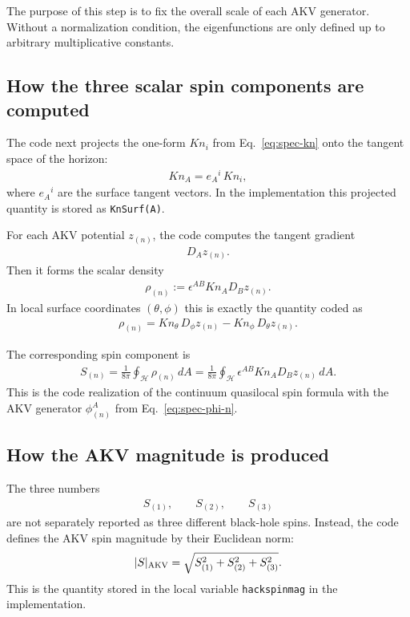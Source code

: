 The purpose of this step is to fix the overall scale of each AKV generator.  Without a normalization condition, the eigenfunctions are only defined up to arbitrary multiplicative constants.

\subsection{How the three scalar spin components are computed}

The code next projects the one-form $Kn_i$ from Eq.~\eqref{eq:spec-kn} onto the tangent space of the horizon:
\begin{align}
Kn_A = e_A{}^i\, Kn_i,
\end{align}
where $e_A{}^i$ are the surface tangent vectors.  In the implementation this projected quantity is stored as \texttt{KnSurf(A)}.

For each AKV potential $z_{(n)}$, the code computes the tangent gradient
\begin{align}
D_A z_{(n)}.
\end{align}
Then it forms the scalar density
\begin{align}
\rho_{(n)}
  := \epsilon^{AB} Kn_A D_B z_{(n)}.
\label{eq:spec-rho-n}
\end{align}
In local surface coordinates $(\theta,\phi)$ this is exactly the quantity coded as
\begin{align}
\rho_{(n)} = Kn_\theta\, D_\phi z_{(n)} - Kn_\phi\, D_\theta z_{(n)}.
\end{align}

The corresponding spin component is
\begin{align}
S_{(n)} = \frac{1}{8\pi}\oint_{\mathcal H} \rho_{(n)}\, dA
        = \frac{1}{8\pi}\oint_{\mathcal H} \epsilon^{AB} Kn_A D_B z_{(n)}\, dA.
\label{eq:spec-Sn}
\end{align}
This is the code realization of the continuum quasilocal spin formula with the AKV generator $\phi^A_{(n)}$ from Eq.~\eqref{eq:spec-phi-n}.

\subsection{How the AKV magnitude is produced}

The three numbers
\begin{align}
S_{(1)}, \qquad S_{(2)}, \qquad S_{(3)}
\end{align}
are not separately reported as three different black-hole spins.  Instead, the code defines the AKV spin magnitude by their Euclidean norm:
\begin{align}
|S|_{\rm AKV}
  = \sqrt{S_{(1)}^2 + S_{(2)}^2 + S_{(3)}^2}.
\label{eq:spec-akv-mag}
\end{align}
This is the quantity stored in the local variable \texttt{hackspinmag} in the implementation.

